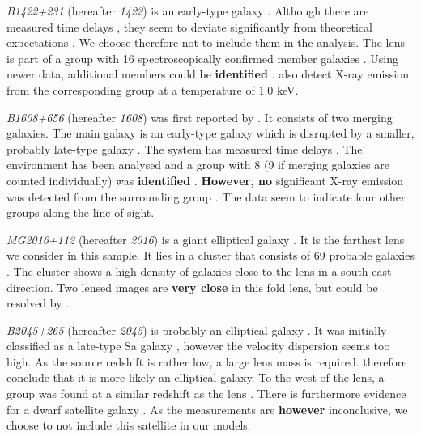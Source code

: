 \documentclass[useAMS,usenatbib]{mn2e}
\newcommand{\cb}[1]{{\color{red} \textbf{#1}}}
\begin{document}
\textit{B1422+231} (hereafter \textit{1422}) is an early-type galaxy \citep{1992MNRAS.259P...1P,1994AJ....107...28Y}. Although there are measured time delays \citep{2001MNRAS.326.1403P}, they seem to deviate significantly from theoretical expectations \citep{2003AJ....126...29R}. We choose therefore not to include them in the analysis. The lens is part of a group with 16 spectroscopically confirmed member galaxies \citep{2006ApJ...641..169M}. Using newer data, additional members could be \cb{identified} \citep{2011ApJ...726...84W}. \cite{2004ApJ...610..686G} also detect X-ray emission from the corresponding group at a temperature of 1.0 keV.

\textit{B1608+656} (hereafter \textit{1608}) was first reported by \cite{1995ApJ...447L...5M}. It consists of two merging galaxies. The main galaxy is an early-type galaxy which is disrupted by a smaller, probably late-type galaxy \citep{2003ApJ...584..100S}. The system has measured time delays \citep{2002ApJ...581..823F}. The environment has been analysed and a group with 8 (9 if merging galaxies are counted individually) was \cb{identified} \citep{2006ApJ...642...30F}. \cb{However, no} significant X-ray emission was detected from the surrounding group \citep{2005ApJ...625..633D}. The data seem to indicate four other groups along the line of sight.

\textit{MG2016+112} (hereafter \textit{2016}) is a giant elliptical galaxy \citep{1984Sci...223...46L,1986AJ.....91..991S}. It is the farthest lens we consider in this sample. It lies in a cluster that consists of 69 probable galaxies \citep{2003MNRAS.344..337T}. The cluster shows a high density of galaxies close to the lens in a south-east direction. Two lensed images are \cb{very close} in this fold lens, but could be resolved by \cite{2009MNRAS.394..174M}.

\textit{B2045+265} (hereafter \textit{2045}) is probably an elliptical galaxy \citep{2007MNRAS.378..109M}. It was initially classified as a late-type Sa galaxy \citep{1999AJ....117..658F}, however the velocity dispersion seems too high. As the source redshift is rather low, a large lens mass is required. \cite{2007MNRAS.378..109M} therefore conclude that it is more likely an elliptical galaxy. To the west of the lens, a group was found at a similar redshift as the lens \citep{1999AJ....117..658F}. There is furthermore evidence for a dwarf satellite galaxy \citep{2007MNRAS.378..109M}. As the measurements are \cb{however} inconclusive, we choose to not include this satellite in our models.
\end{document}
